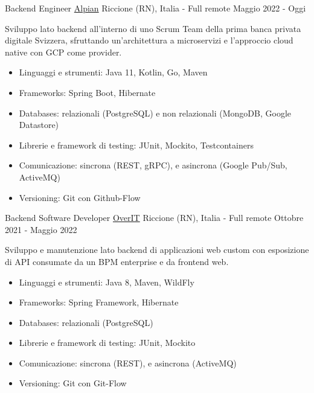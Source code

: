 

\begin{cventries}
	
\cventry
{Backend Engineer} %
{\href{https://alpian.com/it}{Alpian}} %
{Riccione (RN), Italia - Full remote} %
{Maggio 2022 - Oggi} %
{
	Sviluppo lato backend all'interno di uno Scrum Team della prima banca privata digitale Svizzera, sfruttando un'architettura a microservizi e l'approccio cloud native con GCP come provider.
	\begin{itemize}
		\item {Linguaggi e strumenti: Java 11, Kotlin, Go, Maven}
		\item {Frameworks: Spring Boot, Hibernate}
		\item {Databases: relazionali (PostgreSQL) e non relazionali (MongoDB, Google Datastore)}
		\item {Librerie e framework di testing: JUnit, Mockito, Testcontainers}
		\item {Comunicazione: sincrona (REST, gRPC), e asincrona (Google Pub/Sub, ActiveMQ)}
		\item {Versioning: Git con Github-Flow}
	\end{itemize}
}


\cventry
	{Backend Software Developer} %
	{\href{https://overit.it}{OverIT}} %
	{Riccione (RN), Italia - Full remote} %
	{Ottobre 2021 - Maggio 2022} %
	{
		Sviluppo e manutenzione lato backend di applicazioni web custom con esposizione di API consumate da un BPM enterprise e da frontend web.
		\begin{itemize}
			\item {Linguaggi e strumenti: Java 8, Maven, WildFly}
			\item {Frameworks: Spring Framework, Hibernate}
			\item {Databases: relazionali (PostgreSQL)}
			\item {Librerie e framework di testing: JUnit, Mockito}
			\item {Comunicazione: sincrona (REST), e asincrona (ActiveMQ)}
			\item {Versioning: Git con Git-Flow}
		\end{itemize}
	}


\end{cventries}

